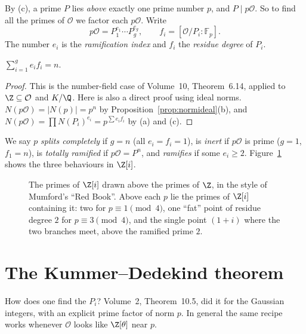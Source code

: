 By (c), a prime $P$ lies \emph{above} exactly one prime number $p$, and $P\mid p\mathcal O$. So to find all the primes of
$\mathcal O$ we factor each $p\mathcal O$. Write
\[
p\mathcal O=P_1^{e_1}\cdots P_g^{e_g},\qquad f_i=[\mathcal O/P_i:\mathbb F_p].
\]
The number $e_i$ is the \emph{ramification index} and $f_i$ the \emph{residue degree} of $P_i$.

\begin{theorem}\label{thm:sumef}
$\displaystyle\sum_{i=1}^ge_if_i=n$.
\end{theorem}
\begin{proof}
This is the number-field case of Volume~10, Theorem~6.14, applied to $\Z\subseteq\mathcal O$ and $K/\Q$. Here is also a direct proof using ideal norms.
$N(p\mathcal O)=|N(p)|=p^n$ by Proposition~\ref{prop:normideal}(b), and $N(p\mathcal O)=\prod N(P_i)^{e_i}=p^{\sum
e_if_i}$ by (a) and (c).
\end{proof}

We say $p$ \emph{splits completely} if $g=n$ (all $e_i=f_i=1$), is \emph{inert} if $p\mathcal O$ is prime ($g=1$,
$f_1=n$), is \emph{totally ramified} if $p\mathcal O=P^n$, and \emph{ramifies} if some $e_i\ge2$. Figure~\ref{fig:spec}
shows the three behaviours in $\Z[i]$.

\begin{figure}[ht]
\centering
{}
\caption{The primes of $\Z[i]$ drawn above the primes of $\Z$, in the style of Mumford's ``Red Book''. Above each $p$
lie the primes of $\Z[i]$ containing it: two for $p\equiv1\pmod 4$, one ``fat'' point of residue degree $2$ for
$p\equiv3\pmod4$, and the single point $(1+i)$ where the two branches meet, above the ramified prime $2$.}
\label{fig:spec}
\end{figure}

\section{The Kummer--Dedekind theorem}

How does one find the $P_i$? Volume~2, Theorem~10.5, did it for the Gaussian integers, with an explicit prime factor of norm $p$. In general
the same recipe works whenever $\mathcal O$ looks like $\Z[\theta]$ near $p$.

